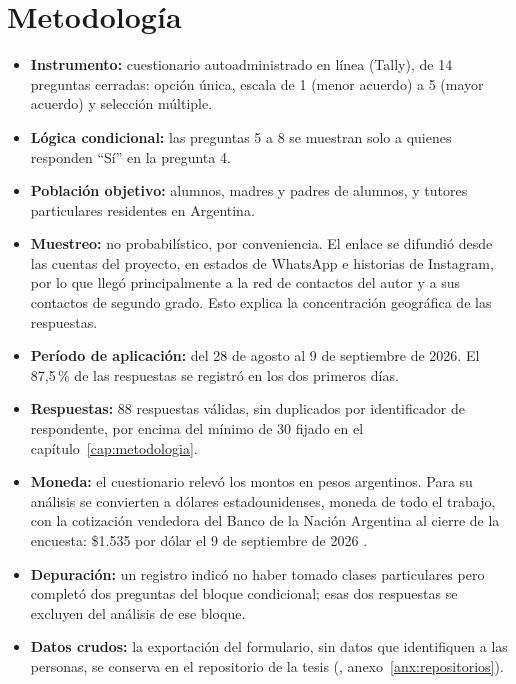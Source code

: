 \section{Metodología}

\begin{itemize}
    \item \textbf{Instrumento:} cuestionario autoadministrado en línea
          (Tally), de 14 preguntas cerradas: opción única, escala de 1
          (menor acuerdo) a 5 (mayor acuerdo) y selección múltiple.
    \item \textbf{Lógica condicional:} las preguntas 5 a 8 se muestran
          solo a quienes responden ``Sí'' en la pregunta 4.
    \item \textbf{Población objetivo:} alumnos, madres y padres de
          alumnos, y tutores particulares residentes en Argentina.
    \item \textbf{Muestreo:} no probabilístico, por conveniencia. El
          enlace se difundió desde las cuentas del proyecto, en estados
          de WhatsApp e historias de Instagram, por lo que llegó
          principalmente a la red de contactos del autor y a sus
          contactos de segundo grado. Esto explica la concentración
          geográfica de las respuestas.
    \item \textbf{Período de aplicación:} del 28 de agosto al 9 de
          septiembre de 2026. El 87,5\,\% de las respuestas se registró
          en los dos primeros días.
    \item \textbf{Respuestas:} 88 respuestas válidas, sin duplicados por
          identificador de respondente, por encima del mínimo de 30
          fijado en el capítulo~\ref{cap:metodologia}.
    \item \textbf{Moneda:} el cuestionario relevó los montos en pesos
          argentinos. Para su análisis se convierten a dólares
          estadounidenses, moneda de todo el trabajo, con la cotización
          vendedora del Banco de la Nación Argentina al cierre de la
          encuesta: \$1.535 por dólar el 9 de septiembre de 2026
          \citep{bna2026}.
    \item \textbf{Depuración:} un registro indicó no haber tomado clases
          particulares pero completó dos preguntas del bloque condicional;
          esas dos respuestas se excluyen del análisis de ese bloque.
    \item \textbf{Datos crudos:} la exportación del formulario, sin datos
          que identifiquen a las personas, se conserva en el repositorio
          de la tesis (,
          anexo~\ref{anx:repositorios}).
\end{itemize}

